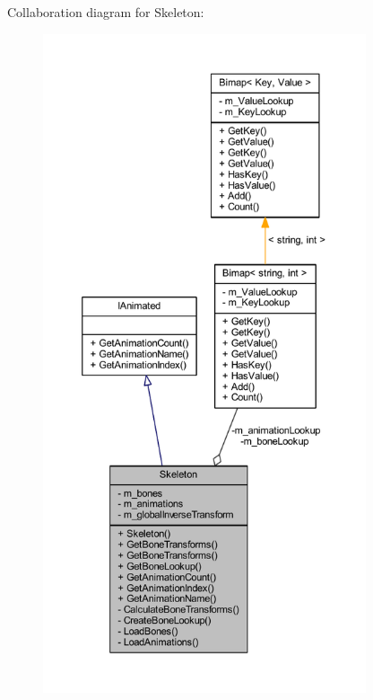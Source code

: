 Collaboration diagram for Skeleton\+:\nopagebreak
\begin{figure}[H]
\begin{center}
\leavevmode
\includegraphics[height=550pt]{class_skeleton__coll__graph}
\end{center}
\end{figure}
